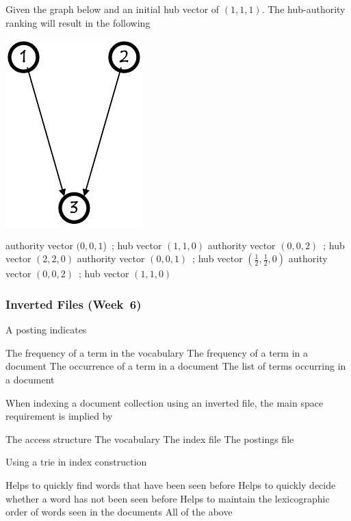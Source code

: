\documentclass[12pt,a4paper]{exam} %
\begin{document}
\begin{flushleft}
\begin{multicols*}{2}
\begin{questions}
\question Given the graph below and an initial hub vector of $(1,1,1)$. The hub-authority ranking will result in the following
\begin{colfig}
\includegraphics[scale=0.3]{w5_s56}
\end{colfig}
\begin{checkboxes}
\choice authority vector $(0,0,1$)~; hub vector $(1,1,0)$
\choice authority vector $(0,0,2)$~; hub vector $(2,2,0)$
\CorrectChoice authority vector $(0,0,1)$~; hub vector $(\frac{1}{2},\frac{1}{2},0)$
\choice authority vector $(0,0,2)$~; hub vector $(1,1,0)$
\end{checkboxes}


\subsubsection{Inverted Files (Week~6)}

\question A posting indicates
\begin{checkboxes}
\choice The frequency of a term in the vocabulary
\choice The frequency of a term in a document
\CorrectChoice The occurrence of a term in a document
\choice The list of terms occurring in a document
\end{checkboxes}

\question When indexing a document collection using an inverted file, the main space requirement is implied by
\begin{checkboxes}
\choice The access structure
\choice The vocabulary
\choice The index file
\CorrectChoice The postings file
\end{checkboxes}

\question Using a trie in index construction
\begin{checkboxes}
\choice Helps to quickly find words that have been seen before
\choice Helps to quickly decide whether a word has not been seen before
\choice Helps to maintain the lexicographic order of words seen in the documents
\CorrectChoice All of the above
\end{checkboxes}


\end{questions}
\end{multicols*}
\end{flushleft}
\end{document}
